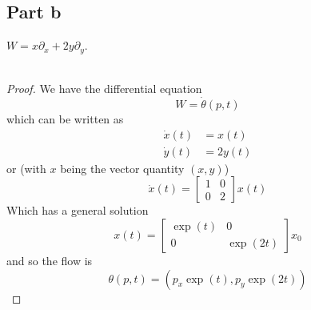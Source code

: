\documentclass[fontsize=11pt]{scrartcl} %
\numberwithin{equation}{section} %
\numberwithin{figure}{section} %
\numberwithin{table}{section} %
\begin{document}
\subsection*{Part b}
$W=x\partial_x + 2y\partial_y$.
\\
\\
\begin{proof}
    We have the differential equation
    \[
        W = \dot{\theta}(p,t)
    \]
    which can be written as
    \[
        \begin{aligned}
            \dot{x}(t) &= x(t)\\
            \dot{y}(t) &=2y(t)
        \end{aligned}
    \]
    or (with $x$ being the vector quantity $(x,y)$)
    \[
        \dot{x}(t) =
        \begin{bmatrix}
        1&0\\
        0&2
        \end{bmatrix}
        x(t)
    \]
    Which has a general solution
    \[
        x(t) =
        \begin{bmatrix}
        \exp(t)&0\\
            0&\exp(2t)
        \end{bmatrix}
        x_0
    \]
    and so the flow is
    \[
        \theta(p,t) = (p_x\exp(t),p_y\exp(2t))
    \]
\end{proof}
\end{document}
